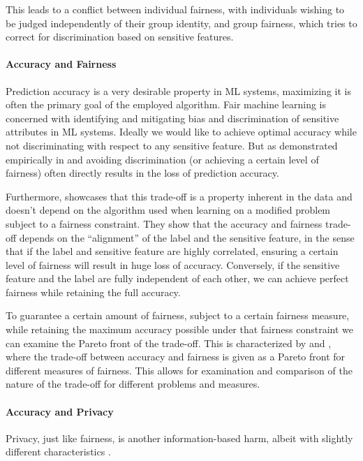     This leads to a conflict between individual fairness, with individuals wishing to be judged independently of their group identity, and group fairness, which tries to correct for discrimination based on sensitive features.

	\paragraph{Accuracy and Fairness}
	Prediction accuracy is a very desirable property in ML systems, maximizing it is often the primary goal of the employed algorithm.
	Fair machine learning is concerned with identifying and mitigating bias and discrimination of sensitive attributes in ML systems.
	Ideally we would like to achieve optimal accuracy while not discriminating with respect to any sensitive feature.
	But as demonstrated empirically in \eg \cite{kamiran2010discrimination} and \cite{zliobaite2015relation} avoiding discrimination (or achieving a certain level of fairness) often directly results in the loss of prediction accuracy.

	Furthermore, \cite{menon2018cost} showcases that this trade-off is a property inherent in the data and doesn't depend on the algorithm used when learning on a modified problem subject to a fairness constraint.
	They show that the accuracy and fairness trade-off depends on the \enquote{alignment} of the label and the sensitive feature, in the sense that if the label and sensitive feature are highly correlated, ensuring a certain level of fairness will result in huge loss of accuracy.
	Conversely, if the sensitive feature and the label are fully independent of each other, we can achieve perfect fairness while retaining the full accuracy.

	To guarantee a certain amount of fairness, subject to a certain fairness measure, while retaining the maximum accuracy possible under that fairness constraint we can examine the Pareto front of the trade-off. 	
	This is characterized by \cite{liu2020accuracy} and \cite{wei2020fairness}, where the trade-off between accuracy and fairness is given as a Pareto front for different measures of fairness.
	This allows for examination and comparison of the nature of the trade-off for different problems and measures.
	

	\paragraph{Accuracy and Privacy}
	Privacy, just like fairness, is another information-based harm, albeit with slightly different characteristics \cite{van2008information}.

